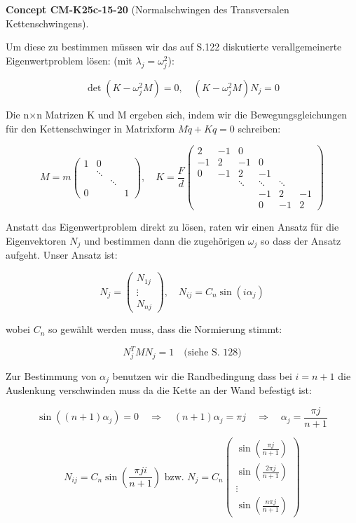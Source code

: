 \documentclass[10pt, letterpaper]{article}
\newcommand{\CustomHeading}[3]{%
  \par\medskip\noindent%
  \textbf{#1 #2} \textnormal{(#3)}.\enskip%
}
\newenvironment{CONC}[2]{\CustomHeading{Concept}{#1}{#2}}{}
\begin{document}
\begin{CONC}{CM-K25c-15-20}{Normalschwingen des Transversalen Kettenschwingens}
Um diese zu bestimmen müssen wir das auf S.122 diskutierte verallgemeinerte Eigenwertproblem lösen: (mit $\lambda_j = \omega_j^2$):

\[
\det(K-\omega_j^2M) = 0, \quad (K-\omega_j^2M)N_j = 0
\]

Die n×n Matrizen K und M ergeben sich, indem wir die Bewegungsgleichungen für den Kettenschwinger in Matrixform $M\ddot{q}+Kq=0$ schreiben:

\[
M = m\begin{pmatrix}
1 & 0 & & \\
& \ddots & & \\
& & \ddots & \\
0 & & & 1
\end{pmatrix}, \quad
K = \frac{F}{d}\begin{pmatrix}
2 & -1 & 0 & & & \\
-1 & 2 & -1 & 0 & & \\
0 & -1 & 2 & -1 & & \\
& & \ddots & \ddots & \ddots & \\
& & & -1 & 2 & -1 \\
& & & 0 & -1 & 2
\end{pmatrix}
\]

Anstatt das Eigenwertproblem direkt zu lösen, raten wir einen Ansatz für die Eigenvektoren $N_j$ und bestimmen dann die zugehörigen $\omega_j$ so dass der Ansatz aufgeht. Unser Ansatz ist:

\[
N_j = \begin{pmatrix}
N_{1j} \\
\vdots \\
N_{nj}
\end{pmatrix}, \quad N_{ij} = C_n \sin(i\alpha_j)
\]

wobei $C_n$ so gewählt werden muss, dass die Normierung stimmt:

\[
N_j^T M N_j = 1 \quad \text{(siehe S. 128)}
\]

Zur Bestimmung von $\alpha_j$ benutzen wir die Randbedingung dass bei $i=n+1$ die Auslenkung verschwinden muss da die Kette an der Wand befestigt ist:

\[
\sin((n+1)\alpha_j) = 0 \quad \Rightarrow \quad (n+1)\alpha_j = \pi j \quad \Rightarrow \quad \alpha_j = \frac{\pi j}{n+1}
\]


\[
N_{ij} = C_n \sin\left(\frac{\pi j i}{n+1}\right) \text{ bzw. } N_j = C_n \begin{pmatrix}
\sin\left(\frac{\pi j}{n+1}\right) \\
\sin\left(\frac{2\pi j}{n+1}\right) \\
\vdots \\
\sin\left(\frac{n\pi j}{n+1}\right)
\end{pmatrix}
\]


\end{CONC}
\end{document}
